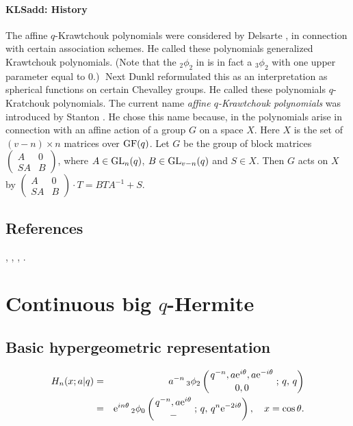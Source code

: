 \documentclass[envcountchap,graybox]{svmono}
\newcommand{\qhyp}[5]{\mbox{}_{#1}{\phi}_{#2}
\left(\genfrac{}{}{0pt}{}{#3}{#4}\,;\,q,\,#5\right)}
\newcommand{\e}{\textrm{e}}
\newcommand{\qhyp}[5]{\,\mbox{}_{#1}\phi_{#2}\!\left(
  \genfrac{}{}{0pt}{}{#3}{#4};#5\right)}
\begin{document}
{{\paragraph{\large\bf KLSadd: History}The affine $q$-Krawtchouk polynomials were considered by Delsarte , \cite[(16)]{K23}
in connection with certain association schemes.
He called these polynomials generalized Krawtchouk polynomials.
(Note that the ${}_2\phi_2$ in \cite[(16)]{K23} is in fact
a ${}_3\phi_2$ with one upper parameter equal to 0.)$\;$
Next Dunkl 
reformulated this as an interpretation as spherical functions
on certain Chevalley groups. He called these polynomials
$q$-Kratchouk polynomials. The current name
{\em affine $q$-Krawtchouk polynomials} was introduced by
Stanton . He chose this name because,
in  the polynomials arise in connection
with an affine action of a group $G$ on a space $X$. Here
$X$ is the set of $(v-n)\times n$ matrices over ${\rm GF}(q)$.
Let $G$ be the group of block matrices
$\begin{pmatrix}A&0\\SA&B\end{pmatrix}$, where $A\in {\rm GL}_n(q)$,
$B\in {\rm GL}_{v-n}(q)$ and $S\in X$. Then $G$ acts on $X$ by
$\begin{pmatrix}A&0\\SA&B\end{pmatrix}\cdot T=BTA^{-1}+S$.
%

\subsection*{References}
\cite{LChiharaStanton}, \cite{Koelink96I}, \cite{Koorn90II}, \cite{Koorn93}.


\section{Continuous big $q$-Hermite}
\par\setcounter{equation}{0}

\subsection*{Basic hypergeometric representation}
\begin{eqnarray}
\label{DefContBigqHermite}
H_n(x;a|q)&=&a^{-n}\,\qhyp{3}{2}{q^{-n},a\e^{i\theta},a\e^{-i\theta}}{0,0}{q}\\
&=&\e^{in\theta}\,\qhyp{2}{0}{q^{-n},a\e^{i\theta}}{-}{q^n\e^{-2i\theta}},
\quad x=\cos\theta.\nonumber
\end{eqnarray}

}}
\end{document}
